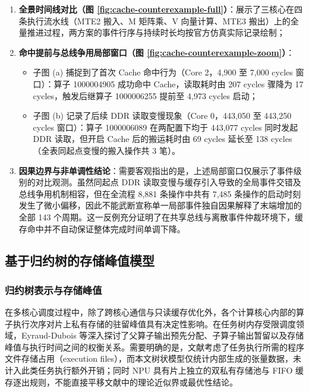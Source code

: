 \documentclass[anonymous,withtoc]{gmcm2026}
\providecommand{\tightlist}{\setlength{\itemsep}{0pt}\setlength{\parskip}{0pt}}
\begin{document}
\begin{enumerate}
\def\labelenumi{\arabic{enumi}.}
\tightlist
\item
  \textbf{全景时间线对比（图 \ref{fig:cache-counterexample-full}）}：展示了三核心在四条执行流水线（MTE2 搬入、M 矩阵乘、V 向量计算、MTE3 搬出）上的全量推进过程，两方案的事件行序与持续时长均按官方仿真实际记录绘制；
\item
  \textbf{命中提前与总线争用局部窗口（图 \ref{fig:cache-counterexample-zoom}）}：

  \begin{itemize}
  \tightlist
  \item
    子图 (a) 捕捉到了首次 Cache 命中行为（Core 2，4,900 至 7,000 cycles 窗口）：算子 1000004905 成功命中 Cache，读取耗时由 207 cycles 骤降为 17 cycles，触发后继算子 1000006255 提前至 4,973 cycles 启动；
  \item
    子图 (b) 记录了后续 DDR 读取变慢现象（Core 0，443,050 至 443,250 cycles 窗口）：算子 1000006089 在两配置下均于 443,077 cycles 同时发起 DDR 读取，但开启 Cache 后的搬运耗时由 69 cycles 延长至 138 cycles（全表同起点变慢的搬入操作共 3 笔）。
  \end{itemize}
\item
  \textbf{因果边界与非单调性结论}：需要客观指出的是，上述局部窗口仅展示了事件级别的对比观测。虽然同起点 DDR 读取变慢与缓存引入导致的全局事件交错及总线争用机制相容，但在全流程 8,881 条操作中共有 7,485 条操作的启动时刻发生了微小偏移，因此不能武断宣称单一局部事件独自因果解释了末端增加的全部 143 个周期。这一反例充分证明了在共享总线与离散事件仲裁环境下，缓存命中并不自动保证整体完成时间单调下降。
\end{enumerate}

\subsection{基于归约树的存储峰值模型}

\subsubsection{归约树表示与存储峰值}

在多核心调度过程中，除了跨核心通信与只读缓存优化外，各个计算核心内部的算子执行次序对片上私有存储的驻留峰值具有决定性影响。在任务树内存受限调度领域，Eyraud-Dubois 等\cite{ref21}深入探讨了父算子输出预先分配、子算子输出暂留以及存储峰值与执行时间之间的权衡关系。需要明确的是，文献\cite{ref21}考虑了任务执行所需的程序文件存储占用（execution files），而本文树状模型仅统计内部生成的张量数据，未计入此类任务执行额外开销；同时 NPU 具有片上独立的双私有存储池与 FIFO 缓存逐出规则，不能直接平移文献\cite{ref21}中的理论近似界或最优性结论。
\end{document}
